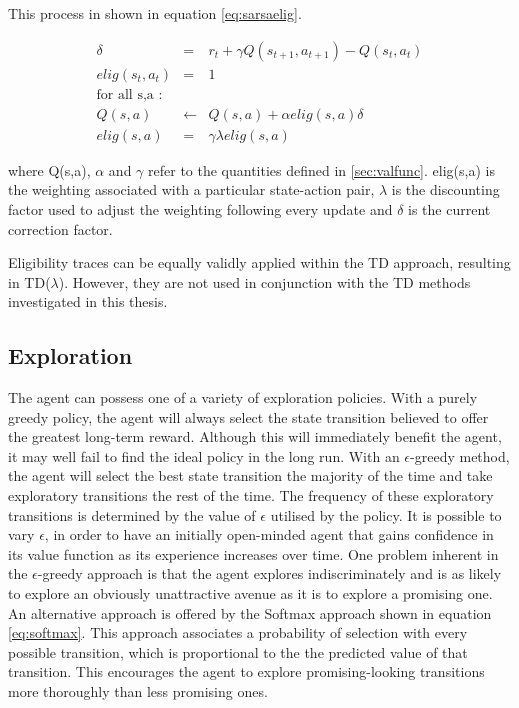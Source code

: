 \documentclass{rucsthesis}
\begin{document}
This process in shown in equation \ref{eq:sarsaelig}.

\begin{eqnarray*}
\delta & = & r_{t} + \gamma Q(s_{t+1},a_{t+1}) - Q(s_t,a_t) \\
elig(s_t,a_t) & = & 1 \\
 \textrm{for all s,a : } & &  \\
Q(s,a) & \leftarrow & Q(s,a) + \alpha elig(s,a) \delta \label{eq:sarsaelig} \\
elig(s,a) & = & \gamma \lambda elig(s,a)
\end{eqnarray*}

where Q(s,a), $\alpha$ and $\gamma$ refer to the quantities defined in \ref{sec:valfunc}.
elig(s,a) is the weighting associated with a particular state-action pair, $\lambda$ is the discounting factor used to adjust the weighting following every update and $\delta$ is the current correction factor.

Eligibility traces can be equally validly applied within the TD approach, resulting in TD($\lambda$). However, they are not used in conjunction with the TD methods investigated in this thesis.

\subsection{Exploration}

The agent can possess one of a variety of exploration policies. With a purely greedy policy, the agent will always select the state transition believed to offer the greatest long-term reward. Although this will immediately benefit the agent, it may well fail to find the ideal policy in the long run. With an $\epsilon$-greedy method, the agent will select the best state transition the majority of the time and take exploratory transitions the rest of the time. The frequency of these exploratory transitions is determined by the value of $\epsilon$ utilised by the policy. It is possible to vary $\epsilon$, in order to have an initially open-minded agent that gains confidence in its value function as its experience increases over time. One problem inherent in the $\epsilon$-greedy approach is that the agent explores indiscriminately and is as likely to explore an obviously unattractive avenue as it is to explore a promising one. An alternative approach is offered by the Softmax approach shown in equation \ref{eq:softmax}. This approach associates a probability of selection with every possible transition, which is proportional to the the predicted value of that transition. This encourages the agent to explore promising-looking transitions more thoroughly than less promising ones.
\end{document}
